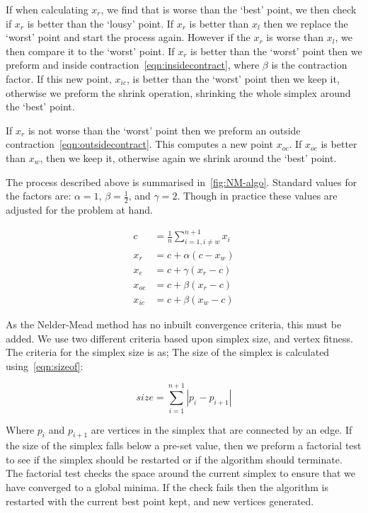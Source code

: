 If when calculating $x_r$, we find that is worse than the `best' point, we then check if $x_r$ is better than the `lousy' point.
If $x_r$ is better than $x_l$ then we replace the `worst' point and start the process again.
However if the $x_r$ is worse than $x_l$, we then compare it to the `worst' point.
If $x_r$ is better than the `worst' point then we preform and inside contraction~\cref{eqn:insidecontract}, where $\beta$ is the contraction factor.
If this new point, $x_{ic}$, is better than the `worst' point then we keep it, otherwise we preform the shrink operation, shrinking the whole simplex around the `best' point.

If $x_r$ is not worse than the `worst' point then we preform an outside contraction~\cref{eqn:outsidecontract}.
This computes a new point $x_{oc}$.
If $x_{oc}$ is better than $x_w$, then we keep it, otherwise again we shrink around the `best' point.

The process described above is summarised in~\cref{fig:NM-algo}.
Standard values for the factors are: $\alpha=1$, $\beta=\frac{1}{2}$, and $\gamma=2$.
Though in practice these values are adjusted for the problem at hand.

\begin{align}
c &= \frac{1}{n}\sum \limits_{i=1,i\neq w}^{n+1} x_i \label{eqn:centroid}\\
x_r &= c + \alpha(c - x_w)\label{eqn:reflect}\\
x_e &= c + \gamma(x_r - c)\label{eqn:expand}\\
x_{oc} &= c + \beta(x_r - c)\label{eqn:outsidecontract}\\
x_{ic} &= c + \beta(x_w - c)\label{eqn:insidecontract}
\end{align}

As the Nelder-Mead method has no inbuilt convergence criteria, this must be added.
We use two different criteria based upon simplex size, and vertex fitness.
The criteria for the simplex size is as; The size of the simplex is calculated using~\cref{eqn:sizeof}:

\begin{equation}
size=\sum\limits_{i=1}^{n+1}|p_{i}-p_{i+1}|
\label{eqn:sizeof}
\end{equation}

Where $p_i$ and $p_{i+1}$ are vertices in the simplex that are connected by an edge. 
If the size of the simplex falls below a pre-set value, then we preform a factorial test to see if the simplex should be restarted or if the algorithm should terminate.
The factorial test checks the space around the current simplex to ensure that we have converged to a global minima.
If the check fails then the algorithm is restarted with the current best point kept, and new vertices generated.

